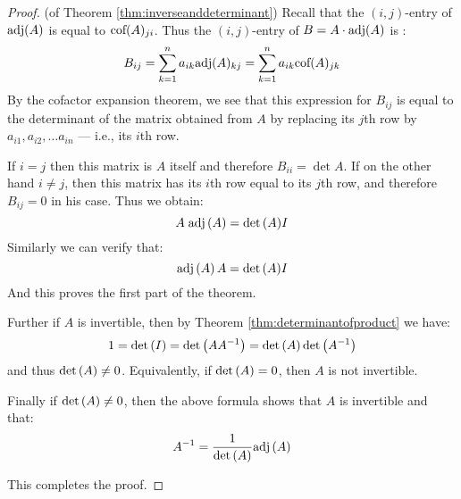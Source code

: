 \begin{proof} (of Theorem \ref{thm:inverseanddeterminant})
Recall that the $(i,j)$-entry of $\mbox{adj}(A)$ is equal to $\mbox{cof}(A)_{ji}$.  Thus the $(i,j)$-entry of   $B=A\cdot \mbox{adj}(A)$ is : 
\[
B_{ij}=\sum_{k=1}^n a_{ik} \mbox{adj} (A)_{kj}= \sum_{k=1}^n a_{ik} \mbox{cof} (A)_{jk}
\]
By the cofactor expansion theorem, we see that this expression for $B_{ij}$ is equal to the determinant of the
matrix obtained from $A$ by replacing its $j$th  row  by $a_{i1}, a_{i2}, \dots a_{in}$ --- i.e., its $i$th row. 

If $i=j$ then this matrix is $A$ itself and therefore $B_{ii}=\det
A$. If on the other hand $i\neq j$, then this matrix has its $i$th row
equal to its $j$th row, and therefore $B_{ij}=0$ in his case. Thus we obtain: 
\begin{equation*}
A \; \mbox{adj}\left(A\right) = {\det \left(A\right)} I
\end{equation*}
Similarly we can verify that:
\begin{equation*}
\mbox{adj}\left(A\right)A = {\det \left(A\right)} I
\end{equation*}
And this proves the first part of the theorem. 

Further if $A$ is  invertible, then by Theorem \ref{thm:determinantofproduct} we have:
\[ 1 = \det \left(I \right) = \det \left(A A^{-1} \right) = \det \left(A \right) \det \left(A^{-1} \right) \]
and thus $\det \left(A \right) \neq 0$. Equivalently, if  $\det \left(A \right) = 0$, then $A$ is not invertible. 

Finally if $\det \left(A \right) \neq 0$, then the above formula shows that $A$ is invertible and that:
\begin{equation*}
A^{-1} = \frac{1}{\det \left(A\right)} \mbox{adj}\left(A\right)
\end{equation*}

This completes the proof.
\end{proof}


